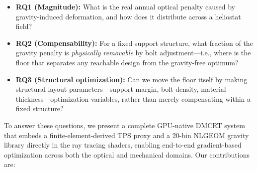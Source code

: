 \documentclass{CVM}
\begin{document}
\begin{itemize}
  \item \textbf{RQ1 (Magnitude):} What is the real annual optical penalty
  caused by gravity-induced deformation, and how does it distribute across a
  heliostat field?

  \item \textbf{RQ2 (Compensability):} For a fixed support structure, what
  fraction of the gravity penalty is \emph{physically removable} by bolt
  adjustment---i.e., where is the floor that separates any reachable design
  from the gravity-free optimum?

  \item \textbf{RQ3 (Structural optimization):} Can we move the floor itself by
  making structural layout parameters---support margin, bolt density, material
  thickness---optimization variables, rather than merely compensating within a
  fixed structure?
\end{itemize}

To answer these questions, we present a complete GPU-native DMCRT system that
embeds a finite-element-derived TPS proxy and a 20-bin NLGEOM gravity library
directly in the ray tracing shaders, enabling end-to-end gradient-based
optimization across both the optical and mechanical domains. Our contributions are:
\end{document}
